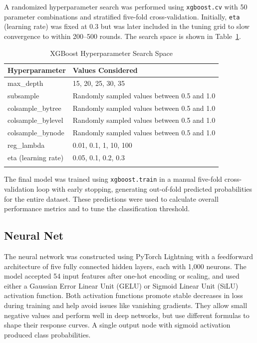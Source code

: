 \documentclass{article}
\begin{document}
A randomized hyperparameter search was performed using \texttt{xgboost.cv} with 50 parameter combinations and stratified five-fold cross-validation. Initially, \texttt{eta} (learning rate) was fixed at 0.3 but was later included in the tuning grid to slow convergence to within 200--500 rounds. The search space is shown in Table~\ref{table:xgb_params}.

\begin{table}[!htbp]
    \centering
    \caption{XGBoost Hyperparameter Search Space}
    \begin{tabular}{ll}
    \arrayrulecolor{black}
    \toprule
    \textbf{Hyperparameter} & \textbf{Values Considered} \\
    \midrule
    \arrayrulecolor{lightgray}
    max\_depth & 15, 20, 25, 30, 35 \\
    \hline
    subsample & Randomly sampled values between 0.5 and 1.0 \\
    \hline
    colsample\_bytree & Randomly sampled values between 0.5 and 1.0 \\
    \hline
    colsample\_bylevel & Randomly sampled values between 0.5 and 1.0 \\
    \hline
    colsample\_bynode & Randomly sampled values between 0.5 and 1.0 \\
    \hline
    reg\_lambda & 0.01, 0.1, 1, 10, 100 \\
    \hline
    eta (learning rate) & 0.05, 0.1, 0.2, 0.3 \\
    \arrayrulecolor{black}
    \bottomrule
    \end{tabular}
    \label{table:xgb_params}
\end{table}

The final model was trained using \texttt{xgboost.train} in a manual five-fold cross-validation loop with early stopping, generating out-of-fold predicted probabilities for the entire dataset. These predictions were used to calculate overall performance metrics and to tune the classification threshold.

\subsection{Neural Net}

The neural network was constructed using PyTorch Lightning with a feedforward architecture of five fully connected hidden layers, each with 1{,}000 neurons. The model accepted 54 input features after one-hot encoding or scaling, and used either a Gaussian Error Linear Unit (GELU) or Sigmoid Linear Unit (SiLU) activation function. Both activation functions promote stable decreases in loss during training and help avoid issues like vanishing gradients. They allow small negative values and perform well in deep networks, but use different formulas to shape their response curves. A single output node with sigmoid activation produced class probabilities.
\end{document}
